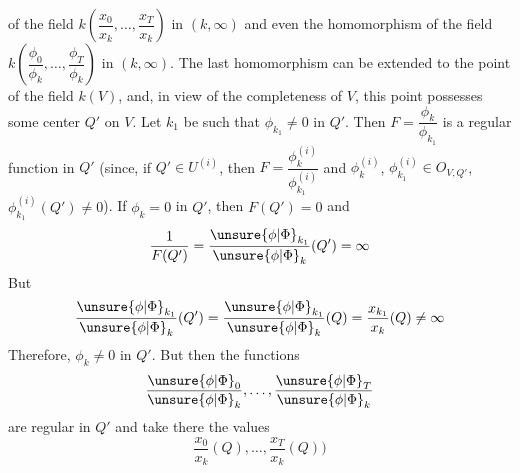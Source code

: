 of the field $k(\dfrac{x_0}{x_k},\ldots,\dfrac{x_T}{x_k})$ in $(k,\infty)$ and even the homomorphism of the field $k(\dfrac{\phi_0}{\phi_k},\ldots,\dfrac{\phi_T}{\phi_k})$ in $(k,\infty)$. The last homomorphism can be extended to the point of the field $k(V)$, and, in view of the completeness of $V$, this point possesses some center $Q'$ on $V$. Let $k_1$ be such that $\phi_{k_1}\ne0$ in $Q'$. Then $F=\dfrac{\phi_k}{\phi_{k_1}}$ is a regular function in $Q'$ (since, if $Q'\in U^{(i)}$, then $F=\dfrac{\phi_k^{(i)}}{\phi_{k_1}^{(i)}}$ and $\phi_k^{(i)}$, $\phi_{k_1}^{(i)}\in O_{V,Q'}$, $\phi_{k_1}^{(i)}(Q')\ne0$). If $\phi_k=0$ in $Q'$, then $F(Q')=0$ and
\[
\frac{1}{F(Q')}=\frac{\unsure{\phi|\Phi}_{k_1}}{\unsure{\phi|\Phi}_k}(Q')=\infty
\]
But
\[
\frac{\unsure{\phi|\Phi}_{k_1}}{\unsure{\phi|\Phi}_k}(Q')=\frac{\unsure{\phi|\Phi}_{k_1}}{\unsure{\phi|\Phi}_k}(Q)=\frac{x_{k_1}}{x_k}(Q)\ne\infty
\]
Therefore, $\phi_k\ne0$ in $Q'$. But then the functions
\[
\frac{\unsure{\phi|\Phi}_0}{\unsure{\phi|\Phi}_k},\ldots,\frac{\unsure{\phi|\Phi}_T}{\unsure{\phi|\Phi}_k}
\]
are regular in $Q'$ and take there the values
\[
\frac{x_0}{x_k}(Q),\ldots,\frac{x_T}{x_k}(Q))
\]

